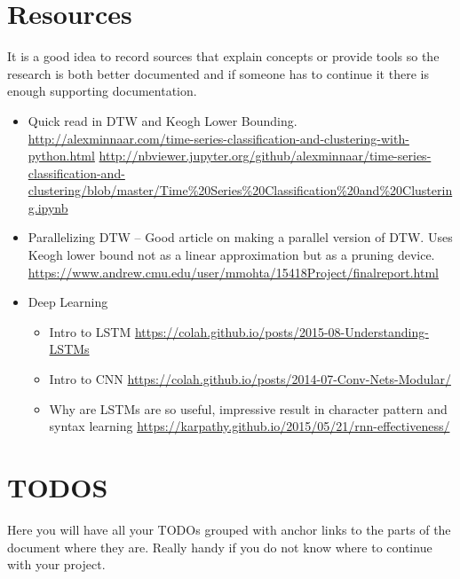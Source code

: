 \documentclass{project-logbook}
\begin{document}
\section{Resources}
	\begin{HighlightedNote}{}
		It is a good idea to record sources that explain concepts or provide tools so the research is both better documented and if someone has to continue it there is enough supporting documentation.
	\end{HighlightedNote}
	\begin{itemize}
    		\item Quick read in DTW and Keogh Lower Bounding. \newline
			\url{http://alexminnaar.com/time-series-classification-and-clustering-with-python.html} \newline
			\url{http://nbviewer.jupyter.org/github/alexminnaar/time-series-classification-and-clustering/blob/master/Time%20Series%20Classification%20and%20Clustering.ipynb}

		\item Parallelizing DTW -- Good article on making a parallel version of DTW. Uses Keogh lower bound not as a linear approximation but as a pruning device. \newline
			\url{https://www.andrew.cmu.edu/user/mmohta/15418Project/finalreport.html}

    		\item Deep Learning
    			\begin{itemize}
        				\item Intro to LSTM \newline
					\url{https://colah.github.io/posts/2015-08-Understanding-LSTMs}
        				\item Intro to CNN \newline
					 \url{https://colah.github.io/posts/2014-07-Conv-Nets-Modular/}
				 \item Why are LSTMs are so useful, impressive result in character pattern and syntax learning \newline
					\url{https://karpathy.github.io/2015/05/21/rnn-effectiveness/}
    			\end{itemize}
	\end{itemize}


\section{TODOS}
	\begin{HighlightedNote}{}
		Here you will have all your TODOs grouped with anchor links to the parts of the document where they are. Really handy if you do not know where to continue with your project.
	\end{HighlightedNote}

	\AddListOfTodos
\end{document}
